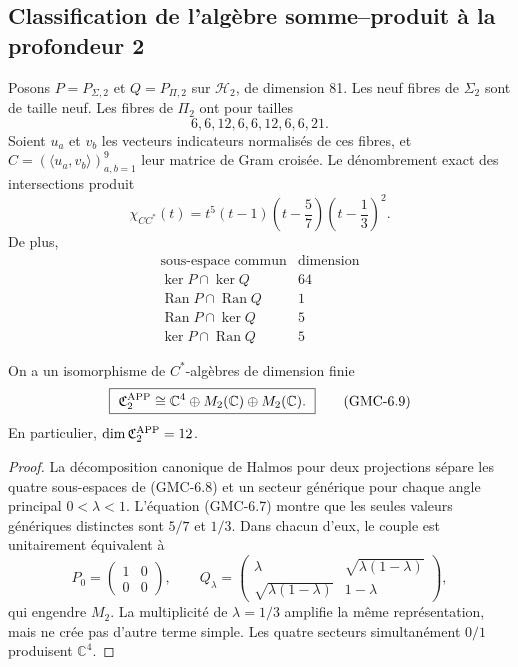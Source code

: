 \subsection{Classification de l'algèbre somme--produit à la profondeur 2}

Posons $P=P_{\Sigma,2}$ et $Q=P_{\Pi,2}$ sur $\mathcal H_2$, de dimension
81. Les neuf fibres de $\Sigma_2$ sont de taille neuf. Les fibres de
$\Pi_2$ ont pour tailles
\[
 6,6,12,6,6,12,6,6,21.
 \tag{GMC-6.6}
\]
Soient $u_a$ et $v_b$ les vecteurs indicateurs normalisés de ces fibres, et
$C=(\langle u_a,v_b\rangle)_{a,b=1}^9$ leur matrice de Gram croisée. Le dénombrement
exact des intersections produit
\[
 \chi_{CC^*}(t)
 =t^5(t-1)\left(t-\frac57\right)
       \left(t-\frac13\right)^2.
 \tag{GMC-6.7}
\]
De plus,
\[
\begin{array}{c|c}
\text{sous-espace commun} & \text{dimension}\\
\hline
\ker P\cap\ker Q&64\\
\operatorname{Ran}P\cap\operatorname{Ran}Q&1\\
\operatorname{Ran}P\cap\ker Q&5\\
\ker P\cap\operatorname{Ran}Q&5
\end{array}
\tag{GMC-6.8}
\]

\begin{theorem}[Algèbre somme--produit d'APP dans $d=2$]
\label{p12-83-c22-s1:gmc:thm:algebra-app-d2}
On a un isomorphisme de $C^*$-algèbres de dimension finie
\[
 \boxed{\ 
 \mathfrak C_2^{\rm APP}
 \cong\mathbb C^4\oplus M_2(\mathbb C)\oplus M_2(\mathbb C).
 \ }
 \tag{GMC-6.9}
\]
En particulier, $\dim\mathfrak C_2^{\rm APP}=12$.
\end{theorem}

\begin{proof}
La décomposition canonique de Halmos pour deux projections sépare les quatre
sous-espaces de \textup{(GMC-6.8)} et un secteur générique pour chaque angle principal
$0<\lambda<1$. L'équation \textup{(GMC-6.7)} montre que les seules valeurs
génériques distinctes sont $5/7$ et $1/3$. Dans chacun d'eux, le couple est unitairement
équivalent à
\[
 P_0=\begin{pmatrix}1&0\\0&0\end{pmatrix},
 \qquad
 Q_\lambda=
 \begin{pmatrix}
  \lambda&\sqrt{\lambda(1-\lambda)}\\
  \sqrt{\lambda(1-\lambda)}&1-\lambda
 \end{pmatrix},
 \tag{GMC-6.10}
\]
qui engendre $M_2$. La multiplicité de $\lambda=1/3$ amplifie la même
représentation, mais ne crée pas d'autre terme simple. Les quatre secteurs
simultanément $0/1$ produisent $\mathbb C^4$.
\end{proof}

